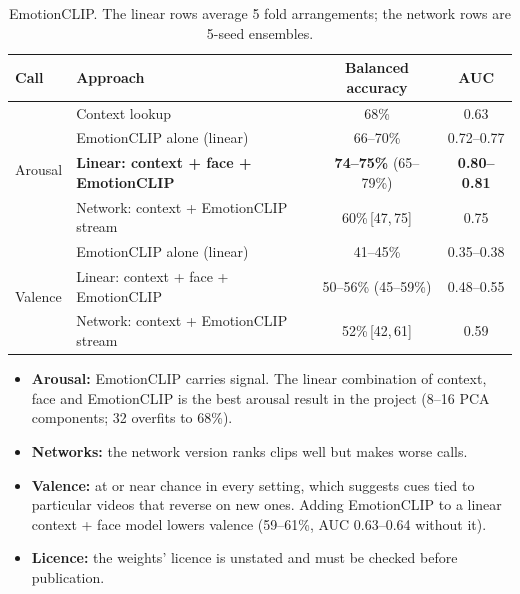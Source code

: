 \documentclass[11pt]{article}
\newcommand{\best}[1]{\textbf{#1}}
\newcommand{\ci}[2]{\,[#1,\,#2]}
\begin{document}
\begin{table}[h]
\centering
\caption{EmotionCLIP. The linear rows average 5 fold arrangements; the network rows are 5-seed ensembles.}
\label{tab:eclip}
\begin{tabular}{llcc}
\toprule
Call & Approach & Balanced accuracy & AUC \\
\midrule
\multirow{4}{*}{Arousal}
 & Context lookup & 68\% & 0.63 \\
 & EmotionCLIP alone (linear) & 66--70\% & 0.72--0.77 \\
 & \best{Linear: context + face + EmotionCLIP} & \best{74--75\%} (65--79\%) & \best{0.80--0.81} \\
 & Network: context + EmotionCLIP stream & 60\%\ci{47}{75} & 0.75 \\
\midrule
\multirow{3}{*}{Valence}
 & EmotionCLIP alone (linear) & 41--45\% & 0.35--0.38 \\
 & Linear: context + face + EmotionCLIP & 50--56\% (45--59\%) & 0.48--0.55 \\
 & Network: context + EmotionCLIP stream & 52\%\ci{42}{61} & 0.59 \\
\bottomrule
\end{tabular}
\end{table}

\begin{itemize}
  \item \textbf{Arousal:} EmotionCLIP carries signal. The linear combination of context, face and EmotionCLIP is the best arousal result in the project (8--16 PCA components; 32 overfits to 68\%).
  \item \textbf{Networks:} the network version ranks clips well but makes worse calls.
  \item \textbf{Valence:} at or near chance in every setting, which suggests cues tied to particular videos that reverse on new ones. Adding EmotionCLIP to a linear context + face model lowers valence (59--61\%, AUC 0.63--0.64 without it).
  \item \textbf{Licence:} the weights' licence is unstated and must be checked before publication.
\end{itemize}
\end{document}
